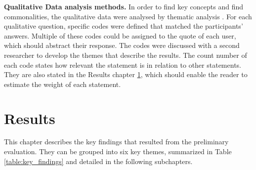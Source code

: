 \documentclass{hasel_thesis}
\begin{document}
\textbf{Qualitative Data analysis methods.}
In order to find key concepts and find commonalities, the qualitative data were analysed by thematic analysis \cite{Braun.2006}. For each qualitative question, specific codes were defined that matched the participants' answers. Multiple of these codes could be assigned to the quote of each user, which should abstract their response. The codes were discussed with a second researcher to develop the themes that describe the results. The count number of each code states how relevant the statement is in relation to other statements. They are also stated in the Results chapter \ref{results}, which should enable the reader to estimate the weight of each statement.

\chapter{Results} \label{results}

This chapter describes the key findings that resulted from the preliminary evaluation. They can be grouped into six key themes, summarized in Table \ref{table:key_findings} and detailed in the following subchapters.
\end{document}
